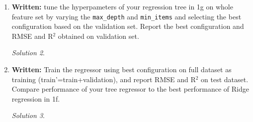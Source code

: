 \documentclass[a4paper,12pt]{article}
\theoremstyle{definition}
\theoremstyle{remark}
\newtheorem*{solution}{Solution}
\begin{document}
\begin{enumerate}
\begin{enumerate}
\begin{solution}
			\end{solution}
			\item {\bf Written:} tune the hyperpameters of your regression tree in 1g on whole feature set by varying the {\tt max\_depth}
			and {\tt min\_items} and selecting the best configuration based on the validation set. Report the best configuration
			and RMSE and R$^2$ obtained on validation set.
			\begin{solution}
				
			\end{solution}
			\item {\bf Written:} Train the regressor using best configuration on full dataset as training (train’=train+validation), and report RMSE and R$^2$ on test dataset. Compare performance of your tree regressor to the best performance of Ridge regression in 1f.
			\begin{solution}
				

\end{solution}
\end{enumerate}
\end{enumerate}
\end{document}
